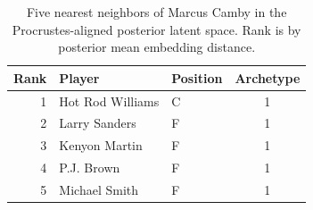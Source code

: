 \begin{table}[htbp]
  \centering\small
  \begin{tabular}{rllc}
    \toprule
    Rank & Player & Position & Archetype \\
    \midrule
    1 & Hot Rod Williams & C & 1 \\
    2 & Larry Sanders & F & 1 \\
    3 & Kenyon Martin & F & 1 \\
    4 & P.J. Brown & F & 1 \\
    5 & Michael Smith & F & 1 \\
    \bottomrule
  \end{tabular}
  \caption{Five nearest neighbors of Marcus Camby in the Procrustes-aligned posterior latent space. Rank is by posterior mean embedding distance.}
  \label{tab:Marcus_Camby_neighbors}
\end{table}

